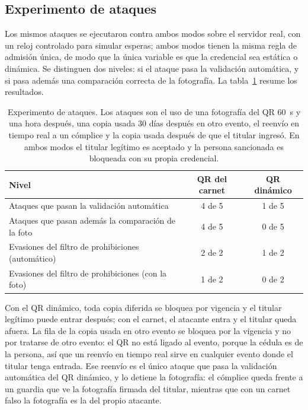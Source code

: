 \subsection{Experimento de ataques}
\label{sec:prototipo-ataques}

Los mismos ataques se ejecutaron contra ambos modos sobre el servidor real, con un reloj
controlado para simular esperas; ambos modos tienen la misma regla de admisión única, de modo que
la única variable es que la credencial sea estática o dinámica. Se distinguen dos niveles: si el
ataque pasa la validación automática, y si pasa además una comparación correcta de la fotografía.
La tabla~\ref{tab:prototipo-ataques} resume los resultados.

\begin{table}[htbp]
  \centering
  \small
  \begin{tabular}{p{6.4cm}cc}
    \toprule
    Nivel & QR del carnet & QR dinámico \\
    \midrule
    Ataques que pasan la validación automática & 4 de 5 & 1 de 5 \\
    Ataques que pasan además la comparación de la foto & 4 de 5 & 0 de 5 \\
    Evasiones del filtro de prohibiciones (automático) & 2 de 2 & 1 de 2 \\
    Evasiones del filtro de prohibiciones (con la foto) & 1 de 2 & 0 de 2 \\
    \bottomrule
  \end{tabular}
  \caption{Experimento de ataques. Los ataques son el uso de una fotografía del QR 60~s y una hora
    después, una copia usada 30 días después en otro evento, el reenvío en tiempo real a un cómplice
    y la copia usada después de que el titular ingresó. En ambos modos el titular legítimo es
    aceptado y la persona sancionada es bloqueada con su propia credencial.}
  \label{tab:prototipo-ataques}
\end{table}

Con el QR dinámico, toda copia diferida se bloquea por vigencia y el titular legítimo puede entrar
después; con el carnet, el atacante entra y el titular queda afuera. La fila de la copia usada en
otro evento se bloquea por la vigencia y no por tratarse de otro evento: el QR no está ligado al
evento, porque la cédula es de la persona, así que un reenvío en tiempo real sirve en cualquier
evento donde el titular tenga entrada. Ese reenvío es el único ataque que pasa la validación
automática del QR dinámico, y lo detiene la fotografía: el cómplice queda frente a un guardia que ve
la fotografía firmada del titular, mientras que con un carnet falso la fotografía es la del propio
atacante.

